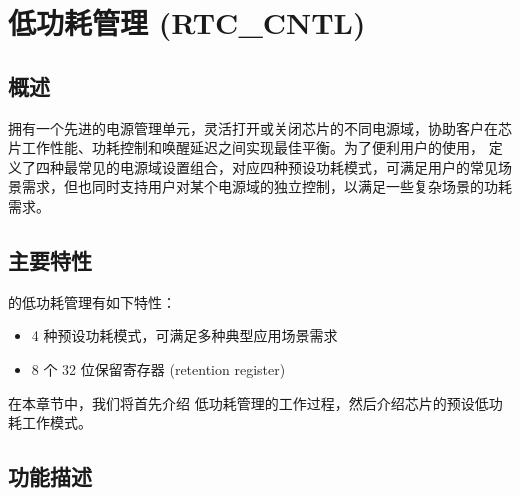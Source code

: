 \documentclass[main\_\_CN.tex]{subfiles}
\begin{document}

\ifglobal
\else
    {\let\clearpage\relax \listoftodos}
    {\let\clearpage\relax \listofdonetodos}
    \tableofcontents
\fi



\hypertarget{lowpowm}{}
\chapter{低功耗管理 (RTC\_CNTL)}\label{mod:lowpowm}

\section{概述}

\chipname{} 拥有一个先进的电源管理单元，灵活打开或关闭芯片的不同电源域，协助客户在芯片工作性能、功耗控制和唤醒延迟之间实现最佳平衡。为了便利用户的使用，\chipname{}  定义了四种最常见的电源域设置组合，对应四种预设功耗模式，可满足用户的常见场景需求，但也同时支持用户对某个电源域的独立控制，以满足一些复杂场景的功耗需求。

\section{主要特性}
\chipname{} 的低功耗管理有如下特性：
\begin{itemize}
\item 4 种预设功耗模式，可满足多种典型应用场景需求
\item 8 个 32 位保留寄存器 (retention register)
\end{itemize}

在本章节中，我们将首先介绍 \chipname{} 低功耗管理的工作过程，然后介绍芯片的预设低功耗工作模式。

\section{功能描述}
\end{document}
